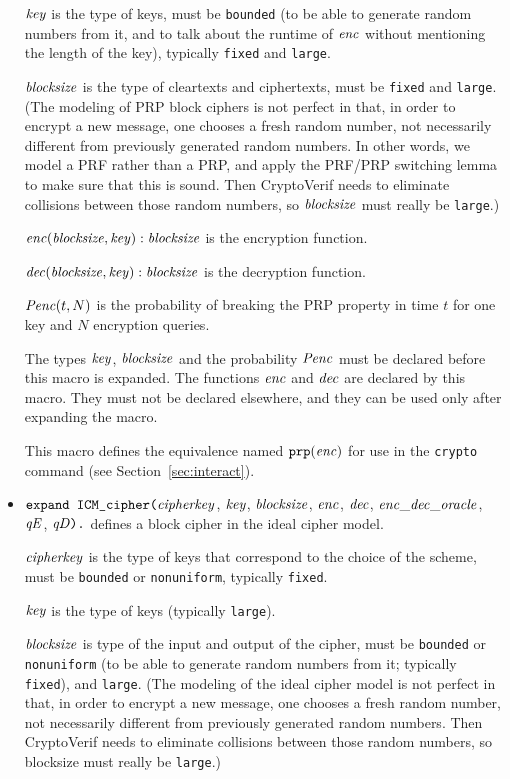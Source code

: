 \documentclass{article}
\begin{document}
\begin{itemize}
   $\mathit{key}$ is the type of keys, must be \texttt{bounded} (to be able to generate random numbers from it, and to talk about the runtime of $\mathit{enc}$ without mentioning the length of the key), typically \texttt{fixed} and \texttt{large}.

   $\mathit{blocksize}$ is the type of cleartexts and ciphertexts, must be
   \texttt{fixed} and \texttt{large}.
   (The modeling of PRP block ciphers is not perfect in that, in order
   to encrypt a new message, one chooses a fresh random number, not
   necessarily different from previously generated random numbers. In
   other words, we model a PRF rather than a PRP, and apply the
   PRF/PRP switching lemma to make sure that this is sound. Then
   CryptoVerif needs to eliminate collisions between those random
   numbers, so $\mathit{blocksize}$ must really be \texttt{large}.)

   $\mathit{enc}(\mathit{blocksize}, \mathit{key}): \mathit{blocksize}$ is the encryption function.

   $\mathit{dec}(\mathit{blocksize}, \mathit{key}): \mathit{blocksize}$ is the
  decryption function.

   $\mathit{Penc}(t, N)$ is the probability of breaking the PRP property
   in time $t$ for one key and $N$ encryption queries.

   The types $\mathit{key}$, $\mathit{blocksize}$ and the probability $\mathit{Penc}$ must
   be declared before this macro is expanded. The functions
   $\mathit{enc}$ and $\mathit{dec}$ are declared by this
   macro. They must not be declared elsewhere, and they can be used
   only after expanding the macro.

   This macro defines the equivalence named $\texttt{prp}(\mathit{enc})$
   for use in the \texttt{crypto} command 
   (see Section~\ref{sec:interact}).

\item $\texttt{expand ICM\_cipher(}\mathit{cipherkey}$, $\mathit{key}$, $\mathit{blocksize}$, $\mathit{enc}$,
$   \mathit{dec}$, $\mathit{enc\_dec\_oracle}$, $\mathit{qE}$, $\mathit{qD}\texttt{).}$
   defines a block cipher in the ideal cipher model.

   $\mathit{cipherkey}$ is the type of keys that correspond to the choice of the scheme, must be \texttt{bounded} or \texttt{nonuniform}, typically \texttt{fixed}.

   $\mathit{key}$ is the type of keys (typically \texttt{large}).

   $\mathit{blocksize}$ is type of the input and output of the cipher, 
   must be \texttt{bounded} or \texttt{nonuniform} (to be able to 
   generate random numbers from it; typically \texttt{fixed}), and \texttt{large}.
   (The modeling of the ideal cipher model is not perfect in that, in
   order to encrypt a new message, one chooses a fresh random number,
   not necessarily different from previously generated random
   numbers. Then CryptoVerif needs to eliminate collisions between
   those random numbers, so blocksize must really be \texttt{large}.)


\end{itemize}
\end{document}
